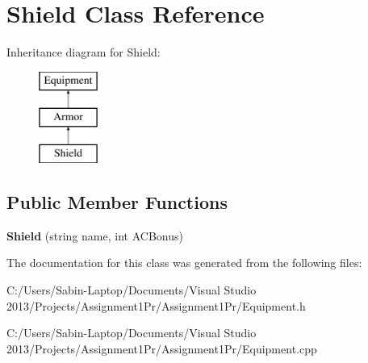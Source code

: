 \hypertarget{class_shield}{}\section{Shield Class Reference}
\label{class_shield}
Inheritance diagram for Shield\+:\begin{figure}[H]
\begin{center}
\leavevmode
\includegraphics[height=3.000000cm]{class_shield}
\end{center}
\end{figure}
\subsection*{Public Member Functions}
\begin{DoxyCompactItemize}
\item 
\hypertarget{class_shield_aa54b1c512cd5f129d7d98bb3693f2f89}{}\label{class_shield_aa54b1c512cd5f129d7d98bb3693f2f89} 
{\bfseries Shield} (string name, int A\+C\+Bonus)
\end{DoxyCompactItemize}


The documentation for this class was generated from the following files\+:\begin{DoxyCompactItemize}
\item 
C\+:/\+Users/\+Sabin-\/\+Laptop/\+Documents/\+Visual Studio 2013/\+Projects/\+Assignment1\+Pr/\+Assignment1\+Pr/Equipment.\+h\item 
C\+:/\+Users/\+Sabin-\/\+Laptop/\+Documents/\+Visual Studio 2013/\+Projects/\+Assignment1\+Pr/\+Assignment1\+Pr/Equipment.\+cpp\end{DoxyCompactItemize}
